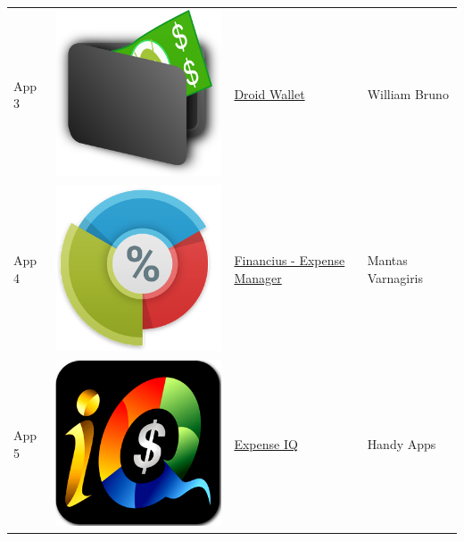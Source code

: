 \begin{tabular}{ | l | c | l | l | }
App 3 & \includegraphics[scale=0.05]{A03_icon.png} & \href{https://play.google.com/store/apps/details?id=com.bruno.myapps.droidwallet}{Droid Wallet} & William Bruno \\

App 4 & \includegraphics[scale=0.05]{A04_icon.png} & \href{https://play.google.com/store/apps/details?id=com.code44.finance}{Financius - Expense Manager} & Mantas Varnagiris \\

App 5 & \includegraphics[scale=0.05]{A05_icon.png} & \href{https://play.google.com/store/apps/details?id=com.handyapps.expenseiq}{Expense IQ} & Handy Apps \\


\end{tabular}

